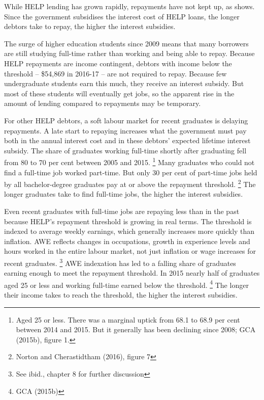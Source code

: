 \documentclass[embargoed]{grattan}
\begin{document}
{While \gls{HELP} lending has grown rapidly, repayments have not kept up, as  shows.
Since the government subsidises the interest cost of \gls{HELP} loans, the longer debtors take to repay, the higher the interest subsidies.

The surge of higher education students since 2009 means that many borrowers are still studying full-time rather than working and being able to repay.
Because \gls{HELP} repayments are income contingent, debtors with income below the threshold -- \$54,869 in 2016-17 -- are not required to repay.
Because few undergraduate students earn this much, they receive an interest subsidy.
But most of these students will eventually get jobs, so the apparent rise in the amount of lending compared to repayments may be temporary.

For other \gls{HELP} debtors, a soft labour market for recent graduates is delaying repayments.
A late start to repaying increases what the government must pay both in the annual interest cost and in these debtors' expected lifetime interest subsidy.
The share of graduates working full-time shortly after graduating fell from 80 to 70 per cent between 2005 and 2015.%
\footnote{Aged 25 or less.
There was a marginal uptick from 68.1 to 68.9 per cent between 2014 and 2015.
But it generally has been declining since 2008; GCA (2015b), figure 1.} Many graduates who could not find a full-time job worked part-time.
But only 30 per cent of part-time jobs held by all bachelor-degree graduates pay at or above the repayment threshold.%
\footnote{Norton and Cherastidtham (2016), figure 7} The longer graduates take to find full-time jobs, the higher the interest subsidies.

Even recent graduates with full-time jobs are repaying less than in the past because \gls{HELP}'s repayment threshold is growing in real terms.
The threshold is indexed to average weekly earnings, which generally increases more quickly than inflation.
\gls{AWE} reflects changes in occupations, growth in experience levels and hours worked in the entire labour market, not just inflation or wage increases for recent graduates.%
\footnote{See ibid., chapter 8 for further discussion} \gls{AWE} indexation has led to a falling share of graduates earning enough to meet the repayment threshold.
In 2015 nearly half of graduates aged 25 or less and working full-time earned below the threshold.%
\footnote{GCA (2015b)} The longer their income takes to reach the threshold, the higher the interest subsidies.

}
\end{document}
